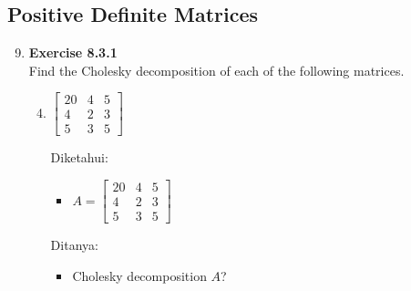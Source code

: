\documentclass[12pt, a4paper]{scrartcl}
\begin{document}
    \subsection*{Positive Definite Matrices}
        \begin{enumerate}
            \setcounter{enumi}{8}
            \item \textbf{Exercise 8.3.1}\\Find the Cholesky decomposition of each of the following matrices.
            \begin{enumerate}
                \setcounter{enumii}{3}
                \item $\begin{bmatrix}
                    20 & 4 & 5\\
                    4 & 2 & 3\\
                    5 & 3 & 5
                \end{bmatrix}$

                Diketahui:
                \begin{itemize}
                    \item[] $A=\begin{bmatrix}
                        20 & 4 & 5\\
                        4 & 2 & 3\\
                        5 & 3 & 5
                    \end{bmatrix}$
                \end{itemize}

                Ditanya:
                \begin{itemize}
                    \item Cholesky decomposition $A$?
                \end{itemize}


\end{enumerate}
\end{enumerate}
\end{document}
